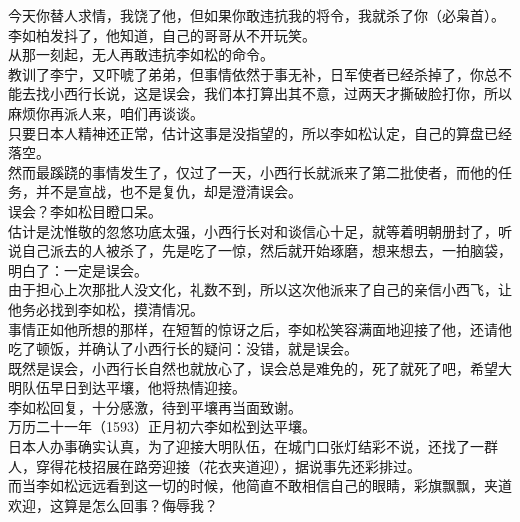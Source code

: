 \begin{multicols}{\theparacolNo}
今天你替人求情，我饶了他，但如果你敢违抗我的将令，我就杀了你（必枭首）。\\

李如柏发抖了，他知道，自己的哥哥从不开玩笑。\\

从那一刻起，无人再敢违抗李如松的命令。\\

教训了李宁，又吓唬了弟弟，但事情依然于事无补，日军使者已经杀掉了，你总不能去找小西行长说，这是误会，我们本打算出其不意，过两天才撕破脸打你，所以麻烦你再派人来，咱们再谈谈。\\

只要日本人精神还正常，估计这事是没指望的，所以李如松认定，自己的算盘已经落空。\\

然而最蹊跷的事情发生了，仅过了一天，小西行长就派来了第二批使者，而他的任务，并不是宣战，也不是复仇，却是澄清误会。\\

误会？李如松目瞪口呆。\\

估计是沈惟敬的忽悠功底太强，小西行长对和谈信心十足，就等着明朝册封了，听说自己派去的人被杀了，先是吃了一惊，然后就开始琢磨，想来想去，一拍脑袋，明白了：一定是误会。\\

由于担心上次那批人没文化，礼数不到，所以这次他派来了自己的亲信小西飞，让他务必找到李如松，摸清情况。\\

事情正如他所想的那样，在短暂的惊讶之后，李如松笑容满面地迎接了他，还请他吃了顿饭，并确认了小西行长的疑问：没错，就是误会。\\

既然是误会，小西行长自然也就放心了，误会总是难免的，死了就死了吧，希望大明队伍早日到达平壤，他将热情迎接。\\

李如松回复，十分感激，待到平壤再当面致谢。\\

万历二十一年（1593）正月初六李如松到达平壤。\\

日本人办事确实认真，为了迎接大明队伍，在城门口张灯结彩不说，还找了一群人，穿得花枝招展在路旁迎接（花衣夹道迎），据说事先还彩排过。\\

而当李如松远远看到这一切的时候，他简直不敢相信自己的眼睛，彩旗飘飘，夹道欢迎，这算是怎么回事？侮辱我？\\


\end{multicols}
